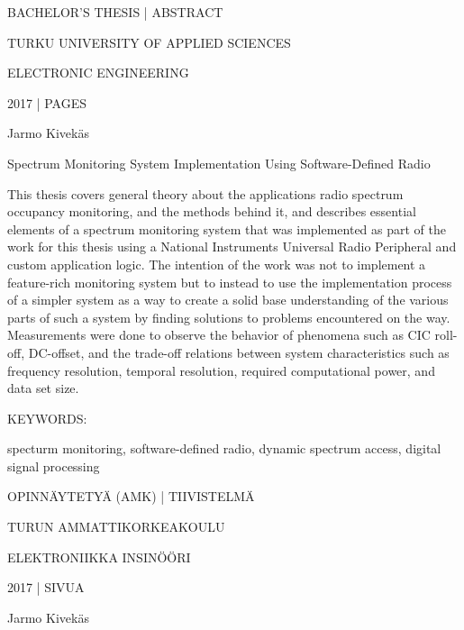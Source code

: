BACHELOR'S THESIS | ABSTRACT

TURKU UNIVERSITY OF APPLIED SCIENCES

ELECTRONIC ENGINEERING

2017 | \pageref{LastPage} PAGES


\vspace{10mm}
{\Large Jarmo Kivekäs \par}

\vspace{10mm}
{\huge Spectrum Monitoring System Implementation Using Software-Defined Radio \par}

\vspace{10mm}



This thesis covers general theory about the applications radio spectrum occupancy
monitoring, and the methods behind it, and describes essential elements of a
spectrum monitoring system that was implemented as part of the work for this
thesis using a National Instruments Universal Radio Peripheral and custom
application logic. The intention of the work was not to implement a feature-rich
monitoring system but to instead to use the implementation process of a simpler
system as a way to create a solid base understanding of the various parts of such
a system by finding solutions to problems encountered on the way.
Measurements were done to observe the behavior of phenomena such as CIC roll-off,
DC-offset, and the trade-off relations between system characteristics such as
frequency resolution, temporal resolution, required computational power,
and data set size.



\vspace{30mm}

KEYWORDS:

specturm monitoring, software-defined radio, dynamic spectrum access, digital signal processing



\clearpage


OPINNÄYTETYÄ (AMK) | TIIVISTELMÄ

TURUN AMMATTIKORKEAKOULU

ELEKTRONIIKKA INSINÖÖRI

2017 | \pageref{LastPage} SIVUA


\vspace{10mm}
{\Large Jarmo Kivekäs \par}

